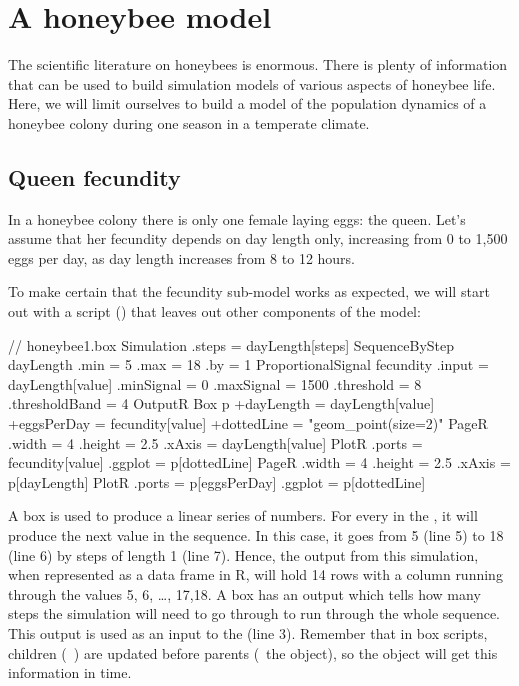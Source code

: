 \FloatBarrier
\section{A honeybee model}
The scientific literature on honeybees is enormous. There is plenty of information that can be used to build simulation models of various aspects of honeybee life. Here, we will limit ourselves to build a model of the population dynamics of a honeybee colony during one season in a temperate climate.

\subsection{Queen fecundity}
In a honeybee colony there is only one female laying eggs: the queen. Let's assume that her fecundity depends on day length only, increasing from 0 to 1,500 eggs per day, as day length increases from 8 to 12 hours.

To make certain that the fecundity sub-model works as expected, we will start out with a  script () that leaves out other components of the model:

\lstset{numbers=left}
\begin{boxscript}
// honeybee1.box
Simulation {
  .steps = dayLength[steps]
  SequenceByStep dayLength {
    .min = 5
    .max = 18
    .by = 1
  }
  ProportionalSignal fecundity {
    .input = dayLength[value]
    .minSignal = 0
    .maxSignal = 1500
    .threshold = 8
    .thresholdBand = 4
  }
  OutputR {
    Box p {
      +dayLength  = dayLength[value]
      +eggsPerDay = fecundity[value]
      +dottedLine = "geom_point(size=2)"
    }
    PageR {
      .width = 4
      .height = 2.5
      .xAxis = dayLength[value]
      PlotR {
        .ports = fecundity[value]
        .ggplot = p[dottedLine]
      }
    }
    PageR {
      .width = 4
      .height = 2.5
      .xAxis = p[dayLength]
      PlotR {
        .ports = p[eggsPerDay]
        .ggplot = p[dottedLine]
      }
    }
  }
}
\end{boxscript}
\lstset{numbers=none}

A  box is used to produce a linear series of numbers. For every  in the , it will produce the next value in the sequence. In this case, it goes from 5 (line 5) to 18 (line 6) by steps of length 1 (line 7). Hence, the output from this simulation, when represented as a data frame in R, will hold 14 rows with a  column running through the values 5, 6, \ldots, 17,18. A  box has an output  which tells how many steps the simulation will need to go through to run through the whole sequence. This output is used as an input to the  (line 3). Remember that in box scripts, children (\eg\ ) are updated before parents (\eg\ the  object), so the  object will get this information in time.


